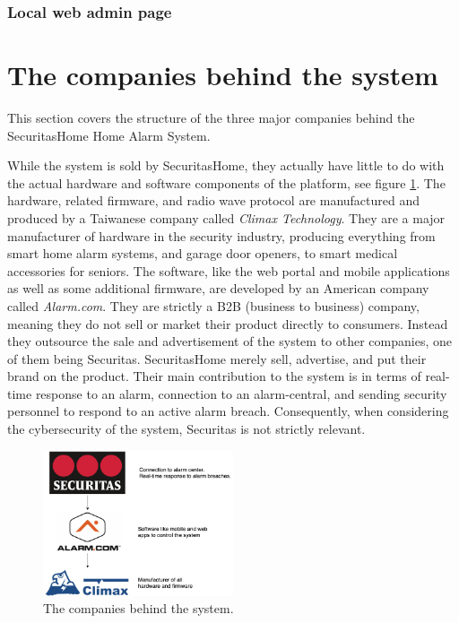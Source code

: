 \subsubsection{Local web admin page}

\section{The companies behind the system}
This section covers the structure of the three major companies behind the SecuritasHome Home Alarm System.

While the system is sold by SecuritasHome, they actually have little to do with the actual hardware and software components of the platform, see figure \ref{fig:company-structure}. The hardware, related firmware, and radio wave protocol are manufactured and produced by a Taiwanese company called \textit{Climax Technology}. They are a major manufacturer of hardware in the security industry, producing everything from smart home alarm systems, and garage door openers, to smart medical accessories for seniors. The software, like the web portal and mobile applications as well as some additional firmware, are developed by an American company called \textit{Alarm.com}. They are strictly a B2B (business to business) company, meaning they do not sell or market their product directly to consumers. Instead they outsource the sale and advertisement of the system to other companies, one of them being Securitas. SecuritasHome merely sell, advertise, and put their brand on the product. Their main contribution to the system is in terms of real-time response to an alarm, connection to an alarm-central, and sending security personnel to respond to an active alarm breach. Consequently, when considering the cybersecurity of the system, Securitas is not strictly relevant.
\begin{figure}[!ht]
    \centering
    \includegraphics[width=0.5\textwidth]{images/company-structure.png}
    \caption{The companies behind the system.}
    \label{fig:company-structure}
\end{figure}
